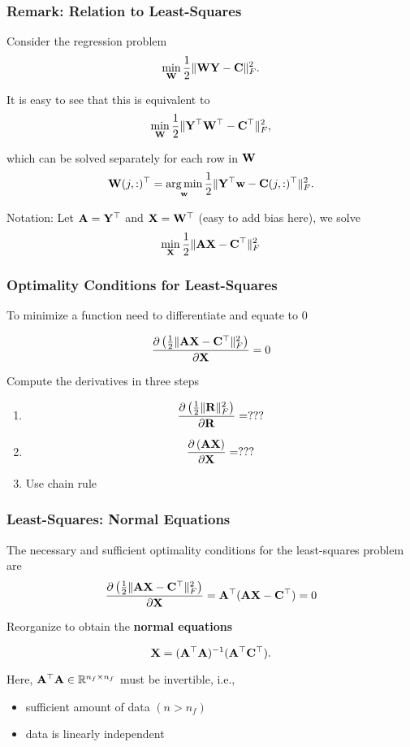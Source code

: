 \documentclass[12pt,fleqn,beamer]{beamer}
\begin{document}
\begin{frame}
	\frametitle{Remark: Relation to Least-Squares}
	
	Consider the regression problem
	$$ \min_{{\bf W}} {\frac 12} \|{\bf W} {\bf Y} - {\bf C}\|^2_F. $$
	
	It is easy to see that this is equivalent to
	$$ \min_{{\bf W}} {\frac 12} \| {\bf Y}^\top {\bf W}^\top - {\bf C}^\top\|^2_F, $$
	
	which can be solved separately for each row in ${\bf W}$
	$$
	{\bf W}(j,:)^\top = \operatorname*{arg\,min}_{{\bf w}} {\frac 12} \| {\bf Y}^\top {\bf w} - {\bf C}(j,:)^\top\|^2_F.
	$$
	
	Notation: Let ${\bf A} = {\bf Y}^\top$ and ${\bf X} = {\bf W}^\top$ (easy to add bias here), we solve
	$$
		\min_{\bf X} {\frac 12} \| {\bf A} {\bf X} - {\bf C}^\top \|^2_F
	$$
		
\end{frame} 
\begin{frame}\frametitle{Optimality Conditions for Least-Squares}

To minimize a function need to differentiate and equate to $0$

$$ {\frac {\partial \left( {\frac 12} \|{\bf A}{\bf X} - {\bf C}^\top\|^2_F \right)}{\partial {\bf X}}} = 0 $$

Compute the derivatives in three steps


\begin{enumerate}
\item $$ {\frac {\partial \left( {\frac 12} \|{\bf R} \|^2_F \right)}{\partial {\bf R}}} = ??? $$

\item $$ {\frac {\partial \left( {\bf A} {\bf X} \right)}{\partial {\bf X}}} = ??? $$

\item Use chain rule

\end{enumerate}


\end{frame} \begin{frame}\frametitle{Least-Squares: Normal Equations}

The necessary and sufficient optimality conditions for the least-squares problem are
$$ {\frac {\partial \left( {\frac 12} \|{\bf A}{\bf X} - {\bf C}^\top\|^2_F \right)}{\partial {\bf X}}} = 
{\bf A}^\top({\bf A} {\bf X} - {\bf C}^\top)=0 $$

Reorganize to obtain the {\bf normal equations}

$$ {\bf X} =  ({\bf A}^\top {\bf A})^{-1}({\bf A}^\top {\bf C}^\top). $$

Here, ${\bf A}^\top {\bf A} \in \mathbb{R}^{n_f \times n_f}$ must be invertible, i.e., 
\begin{itemize}
\item sufficient amount of data $(n>n_f)$
\item data is linearly independent
\end{itemize}

\end{frame}
\end{document}
